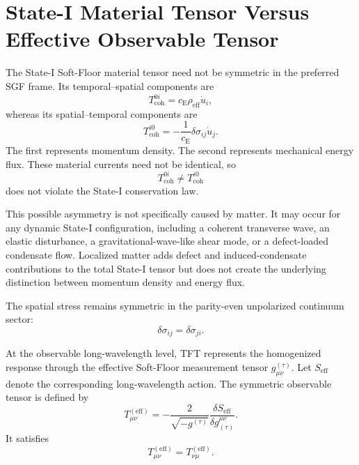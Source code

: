 \section{State-I Material Tensor Versus Effective Observable Tensor}

The State-I Soft-Floor material tensor need not be symmetric in the preferred SGF frame. Its temporal--spatial components are
\begin{equation}
    T_{\mathrm{coh}}^{0i} = c_{\mathrm{E}}\rho_{\mathrm{eff}}\dot{u}_i,
\end{equation}
whereas its spatial--temporal components are
\begin{equation}
    T_{\mathrm{coh}}^{i0} = -\frac{1}{c_{\mathrm{E}}} \delta\sigma_{ij}\dot{u}_j.
\end{equation}
The first represents momentum density. The second represents mechanical energy flux. These material currents need not be identical, so
\begin{equation}
    T_{\mathrm{coh}}^{0i} \neq T_{\mathrm{coh}}^{i0}
\end{equation}
does not violate the State-I conservation law.

This possible asymmetry is not specifically caused by matter. It may occur for any dynamic State-I configuration, including a coherent transverse wave, an elastic disturbance, a gravitational-wave-like shear mode, or a defect-loaded condensate flow. Localized matter adds defect and induced-condensate contributions to the total State-I tensor but does not create the underlying distinction between momentum density and energy flux.

The spatial stress remains symmetric in the parity-even unpolarized continuum sector:
\begin{equation}
    \delta\sigma_{ij}=\delta\sigma_{ji}.
\end{equation}

At the observable long-wavelength level, TFT represents the homogenized response through the effective Soft-Floor measurement tensor $g_{\mu\nu}^{(\tau)}$. Let $S_{\mathrm{eff}}$ denote the corresponding long-wavelength action. The symmetric observable tensor is defined by
\begin{equation}
    T_{\mu\nu}^{(\mathrm{eff})} = -\frac{2}{\sqrt{-g^{(\tau)}}} \frac{\delta S_{\mathrm{eff}}} {\delta g_{(\tau)}^{\mu\nu}}.
\end{equation}
It satisfies
\begin{equation}
    T_{\mu\nu}^{(\mathrm{eff})} = T_{\nu\mu}^{(\mathrm{eff})}.
\end{equation}


